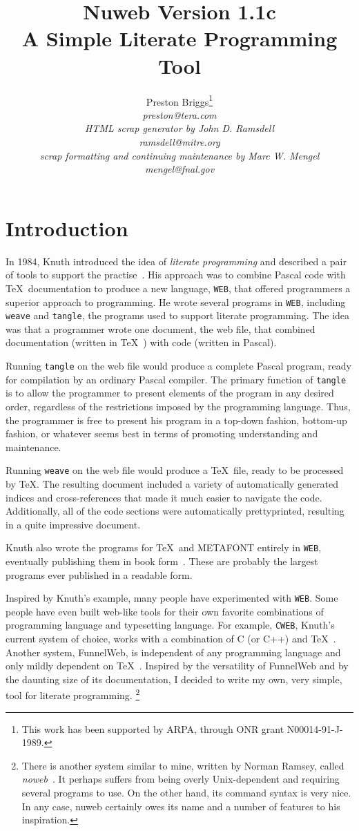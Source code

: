 \documentclass{report}
\title{Nuweb Version 1.1c \\ A Simple Literate Programming Tool}
\date{}
\author{Preston Briggs\thanks{This work has been supported by ARPA,
through ONR grant N00014-91-J-1989.} 
\\ \sl preston@tera.com
\\ HTML scrap generator by John D. Ramsdell
\\ \sl ramsdell@mitre.org
\\ scrap formatting and continuing maintenance by Marc W. Mengel
\\ \sl mengel@fnal.gov}
\begin{document}
\maketitle
\tableofcontents

\chapter{Introduction}

In 1984, Knuth introduced the idea of {\em literate programming\/} and
described a pair of tools to support the practise~\cite{Knuth:CJ-27-2-97}.
His approach was to combine Pascal code with \TeX\ documentation to
produce a new language, \verb|WEB|, that offered programmers a superior
approach to programming. He wrote several programs in \verb|WEB|,
including \verb|weave| and \verb|tangle|, the programs used to support
literate programming.
The idea was that a programmer wrote one document, the web file, that
combined documentation (written in \TeX~\cite{Knuth:ct-a}) with code
(written in Pascal).

Running \verb|tangle| on the web file would produce a complete
Pascal program, ready for compilation by an ordinary Pascal compiler.
The primary function of \verb|tangle| is to allow the programmer to
present elements of the program in any desired order, regardless of
the restrictions imposed by the programming language. Thus, the
programmer is free to present his program in a top-down fashion,
bottom-up fashion, or whatever seems best in terms of promoting
understanding and maintenance.

Running \verb|weave| on the web file would produce a \TeX\ file, ready
to be processed by \TeX\@. The resulting document included a variety of
automatically generated indices and cross-references that made it much
easier to navigate the code. Additionally, all of the code sections
were automatically prettyprinted, resulting in a quite impressive
document. 

Knuth also wrote the programs for \TeX\ and {\small\sf METAFONT}
entirely in \verb|WEB|, eventually publishing them in book
form~\cite{Knuth:ct-b,Knuth:ct-d}. These are probably the
largest programs ever published in a readable form.

Inspired by Knuth's example, many people have experimented with
\verb|WEB|\@. Some people have even built web-like tools for their
own favorite combinations of programming language and typesetting
language. For example, \verb|CWEB|, Knuth's current system of choice,
works with a combination of C (or C++) and \TeX~\cite{Levy:TB8-1-12}.
Another system, FunnelWeb, is independent of any programming language
and only mildly dependent on \TeX~\cite{Williams:FUM92}. Inspired by the
versatility of FunnelWeb and by the daunting size of its
documentation, I decided to write my own, very simple, tool for
literate programming.%
\footnote{There is another system similar to
mine, written by Norman Ramsey, called {\em noweb}~\cite{Ramsey:LPT92}. It
perhaps suffers from being overly Unix-dependent and requiring several
programs to use. On the other hand, its command syntax is very nice.
In any case, nuweb certainly owes its name and a number of features to
his inspiration.}
\end{document}
